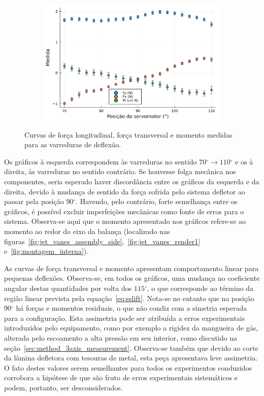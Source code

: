 \begin{figure}[htbp]
\begin{subfigure}{0.49\textwidth}
    \end{subfigure}
    \begin{subfigure}{0.49\textwidth}
        \includegraphics[width=\textwidth]{img/results/exp12_5bar_110_a_70.png}
    \end{subfigure}
    \caption{Curvas de força longitudinal, força transversal e momento medidas para as varreduras de deflexão.}\label{fig:deflection_forces}
\end{figure}

Os gráficos à esquerda correspondem às varreduras no sentido \(70\mathrm{^{\circ}} \rightarrow 110\mathrm{^\circ}\) e os à direita, às varreduras no sentido contrário. Se houvesse folga mecânica nos componentes, seria esperado haver discordância entre os gráficos da esquerda e da direita, devido à mudança de sentido da força sofrida pelo sistema defletor ao passar pela posição \(90\mathrm{^{\circ}}\). Havendo, pelo contrário, forte semelhança entre os gráficos, é possível excluir imperfeições mecânicas como fonte de erros para o sistema. Observa-se aqui que o momento apresentado nos gráficos refere-se ao momento ao redor do eixo da balança (localizado nas figuras~\ref{fig:jet_vanes_assembly_side},~\ref{fig:jet_vanes_render1} e~\ref{fig:montagem_interna}).

As curvas de força transversal e momento apresentam comportamento linear para pequenas deflexões. Observa-se, em todos os gráficos, uma mudança no coeficiente angular destas quantidades por volta dos \(115\mathrm{^{\circ}}\), o que corresponde ao término da região linear prevista pela equação~\ref{eq:sslift}. Nota-se no entanto que na posição \(90\mathrm{^\circ}\) há forças e momentos residuais, o que não condiz com a simetria esperada para a configuração. Esta assimetria pode ser atribuída a erros experimentais introduzidos pelo equipamento, como por exemplo a rigidez da mangueira de gás, alterada pelo escoamento a alta pressão em seu interior, como discutido na seção~\ref{sec:method_3axis_measurement}. Observa-se também que devido ao corte da lâmina defletora com tesouras de metal, esta peça apresentava leve assimetria. O fato destes valores serem semelhantes para todos os experimentos conduzidos corrobora a hipótese de que são fruto de erros experimentais sistemáticos e podem, portanto, ser desconsiderados.

